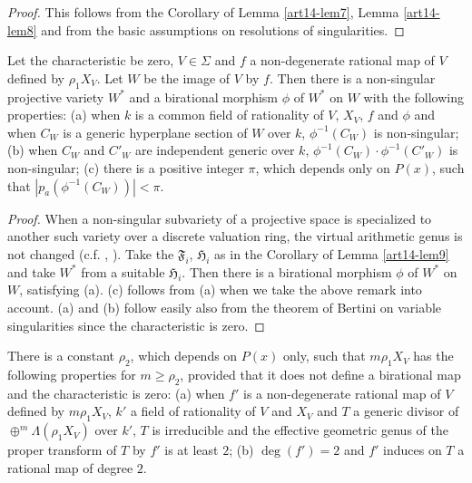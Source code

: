 \begin{proof}
This follows from the Corollary of Lemma \ref{art14-lem7}, Lemma \ref{art14-lem8} and from the basic assumptions on resolutions of singularities.
\end{proof}

\begin{lemma}\label{art14-lem10}
Let the characteristic be zero, $V\in\Sigma$ and $f$ a non-degene\-rate rational map of $V$ defined by $\rho_{1}X_{V}$. Let $W$ be the image of $V$ by $f$. Then there is a non-singular projective variety $W^{*}$ and a birational morphism $\phi$ of $W^{*}$ on $W$ with the following properties: {\rm(a)} when $k$ is a common field of rationality of $V$, $X_{V}$, $f$ and $\phi$ and when $C_{W}$ is a generic hyperplane section of $W$ over $k$, $\phi^{-1}(C_{W})$ is non-singular; {\rm(b)} when $C_{W}$ and $C'_{W}$ are independent generic over $k$, $\phi^{-1}(C_{W})\cdot \phi^{-1}(C'_{W})$ is non-singular; {\rm(c)} there is a positive integer $\pi$, which depends only on $P(x)$, such that $|p_{a}(\phi^{-1}(C_{W}))|<\pi$.
\end{lemma}

\begin{proof}
When a non-singular subvariety of a projective space is specialized to another such variety over a discrete valuation ring, the virtual arithmetic genus is not changed (c.f. \cite{art14-key2}, \cite{art14-key4}). Take the $\mathfrak{F}_{i}$, $\mathfrak{H}_{i}$ as in the Corollary of Lemma \ref{art14-lem9} and take $W^{*}$ from a suitable $\mathfrak{H}_{i}$. Then there is a birational morphism $\phi$ of $W^{*}$ on $W$, satisfying (a). (c) follows from (a) when we take the above remark into account. (a) and (b) follow easily also from the theorem of Bertini on variable singularities since the characteristic is zero.
\end{proof}

\begin{lemma}\label{art14-lem11}
There is a constant $\rho_{2}$, which depends on $P(x)$ only, such that $m\rho_{1}X_{V}$ has the following properties for $m\geq \rho_{2}$, provided that it does not define a birational map and the characteristic is zero: {\rm(a)} when $f'$ is a non-degenerate rational map of $V$ defined by $m\rho_{1}X_{V}$, $k'$ a field of rationality of $V$ and $X_{V}$ and $T$ a generic divisor of\pageoriginale $\oplus^{m}\Lambda(\rho_{1}X_{V})$ over $k'$, $T$ is irreducible and the effective geometric genus of the proper transform of $T$ by $f'$ is at least $2$; {\rm(b)} $\deg (f')=2$ and $f'$ induces on $T$ a rational map of degree $2$.
\end{lemma}

